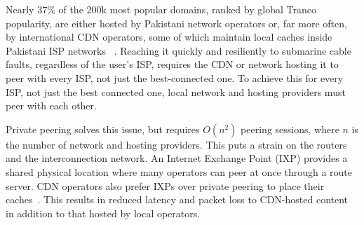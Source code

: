 \documentclass[sigconf,anonymous,10pt]{acmart}
\begin{document}
Nearly $37$\% of the $200\text{k}$ most popular domains, ranked by global Tranco popularity, are either hosted by Pakistani network operators or, far more often, by international CDN operators, some of which maintain local caches inside Pakistani ISP networks ~\cite{tranco}. Reaching it quickly and resiliently to submarine cable faults, regardless of the user's ISP, requires the CDN or network hosting it to peer with every ISP, not just the best-connected one.
To achieve this for every ISP, not just the best connected one, local network and hosting providers must peer with each other.

Private peering solves this issue, but requires $O(n^2)$ peering sessions, where $n$ is the number of network and hosting providers. This puts a strain on the routers and the interconnection network. An Internet Exchange Point (IXP) provides a shared physical location where many operators can peer at once through a route server. CDN operators also prefer IXPs over private peering to place their caches~\cite{opalinski2024quest}. This results in reduced latency and packet loss to CDN-hosted content in addition to that hosted by local operators. 
\end{document}
